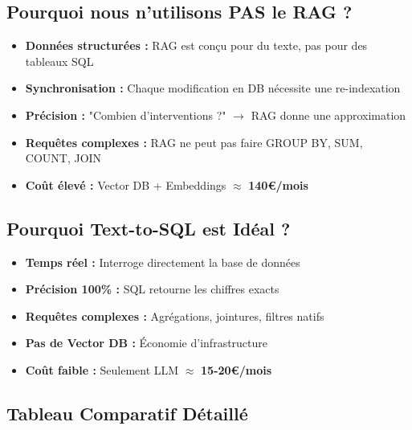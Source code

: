 \documentclass[12pt,a4paper]{article}
\begin{document}
\subsection{Pourquoi nous n'utilisons PAS le RAG ?}

\begin{dangerbox}[title={\faTimesCircle\ Problèmes du RAG pour GMAO}]
\begin{itemize}[leftmargin=*]
    \item \textbf{Données structurées :} RAG est conçu pour du texte, pas pour des tableaux SQL
    \item \textbf{Synchronisation :} Chaque modification en DB nécessite une re-indexation
    \item \textbf{Précision :} "Combien d'interventions ?" $\rightarrow$ RAG donne une approximation
    \item \textbf{Requêtes complexes :} RAG ne peut pas faire GROUP BY, SUM, COUNT, JOIN
    \item \textbf{Coût élevé :} Vector DB + Embeddings $\approx$ \textbf{140€/mois}
\end{itemize}
\end{dangerbox}

\subsection{Pourquoi Text-to-SQL est Idéal ?}

\begin{successbox}[title={\faCheckCircle\ Avantages du Text-to-SQL pour GMAO}]
\begin{itemize}[leftmargin=*]
    \item \textbf{Temps réel :} Interroge directement la base de données
    \item \textbf{Précision 100\% :} SQL retourne les chiffres exacts
    \item \textbf{Requêtes complexes :} Agrégations, jointures, filtres natifs
    \item \textbf{Pas de Vector DB :} Économie d'infrastructure
    \item \textbf{Coût faible :} Seulement LLM $\approx$ \textbf{15-20€/mois}
\end{itemize}
\end{successbox}

\subsection{Tableau Comparatif Détaillé}
\end{document}
